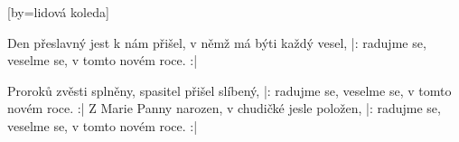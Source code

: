 [by={lidová koleda}]

\beginverse
Den přeslavný jest k nám přišel,
v němž má býti každý vesel,
|: radujme se, veselme se,
v tomto novém roce. :|
\endverse

\beginverse
Proroků zvěsti splněny,
spasitel přišel slíbený,
|: radujme se, veselme se,
v tomto novém roce. :|
\endverse
\beginverse
Z Marie Panny narozen,
v chudičké jesle položen,
|: radujme se, veselme se,
v tomto novém roce. :|
\endverse

\endsong


